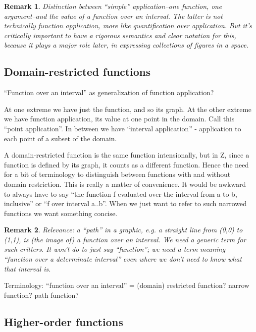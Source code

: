 \documentclass[12pt]{tufte-handout}
\numberwithin{equation}{subsection}
\numberwithin{equation}{subsection}
\newtheorem{remark}{Remark}
\begin{document}
  \begin{remark}
    Distinction between ``simple'' application--one function, one
    argument--and the value of a function over an interval.  The
    latter is not technically function application, more like
    quantification over application.  But it's critically important to
    have a rigorous semantics and clear notation for this, because it
    plays a major role later, in expressing collections of figures in
    a space.
  \end{remark}

  \subsection{Domain-restricted functions}
  \label{subs:domrestrfunc}

  ``Function over an interval'' as generalization of function application?

  At one extreme we have just the function, and so its graph.  At the
  other extreme we have function application, its value at one point
  in the domain.  Call this ``point application''.  In between we have
  ``interval application'' - application to each point of a subset of
  the domain.

  A domain-restricted function is the same function intensionally, but
  in Z, since a function is defined by its graph, it counts as a
  different function.  Hence the need for a bit of terminology to
  distinguish between functions with and without domain restriction.
  This is really a matter of convenience.  It would be awkward to
  always have to say ``the function f evaluated over the interval from
  a to b, inclusive'' or ``f over interval a..b''.  When we just want
  to refer to such narrowed functions we want something concise.

  \begin{remark}
    Relevance: a ``path'' in a graphic, e.g. a straight line from
    (0,0) to (1,1), is (the image of) a function over an interval.  We
    need a generic term for such critters.  It won't do to just say
    ``function''; we need a term meaning ``function over a determinate
    interval'' even where we don't need to know what that interval is.
  \end{remark}

  {\todo Terminology: ``function over an interval'' = (domain)
    restricted function?  narrow function?  path function?}


  \subsection{Higher-order functions}
  \label{subs:hiordfunc}
\end{document}
